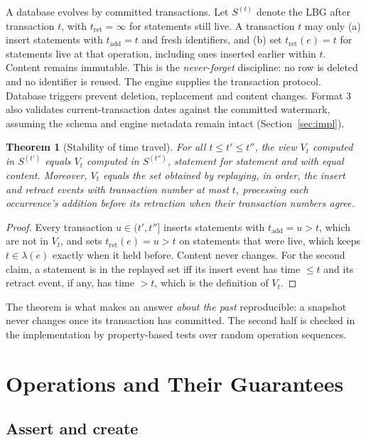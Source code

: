 \documentclass[11pt]{article}
\theoremstyle{plain}
\newtheorem{theorem}{Theorem}
\theoremstyle{definition}
\theoremstyle{remark}
\newcommand{\life}{\lambda}              %
\newcommand{\tadd}{t_{\mathrm{add}}}
\newcommand{\tret}{t_{\mathrm{ret}}}
\begin{document}
A database evolves by committed transactions. Let $S^{(t)}$ denote the LBG
after transaction $t$, with $\tret=\infty$ for statements still live. A
transaction $t$ may only (a) insert statements with $\tadd=t$ and fresh
identifiers, and (b) set $\tret(e)=t$ for statements live at that operation,
including ones inserted earlier within $t$. Content remains immutable.
This is the \emph{never-forget} discipline: no row is deleted and no identifier
is reused. The engine supplies the transaction protocol. Database triggers
prevent deletion, replacement and content changes. Format 3 also validates
current-transaction dates against the committed watermark, assuming the schema
and engine metadata remain intact (Section~\ref{sec:impl}).

\begin{theorem}[Stability of time travel]\label{thm:stability}
For all $t\le t'\le t''$, the view $V_t$ computed in $S^{(t')}$ equals $V_t$
computed in $S^{(t'')}$, statement for statement and with equal content.
Moreover, $V_t$ equals the set obtained by replaying, in order, the insert and
retract events with transaction number at most $t$, processing each occurrence's
addition before its retraction when their transaction numbers agree.
\end{theorem}

\begin{proof}
Every transaction $u\in(t',t'']$ inserts statements with $\tadd=u>t$, which
are not in $V_t$, and sets $\tret(e)=u>t$ on statements that were live, which
keeps $t\in\life(e)$ exactly when it held before. Content never changes. For
the second claim, a statement is in the replayed set iff its insert event has
time $\le t$ and its retract event, if any, has time $>t$, which is the
definition of $V_t$.
\end{proof}

The theorem is what makes an answer \emph{about the past} reproducible: a
snapshot never changes once its transaction has committed. The second half is
checked in the implementation by property-based tests over random operation
sequences.

\section{Operations and Their Guarantees}\label{sec:ops}

\subsection{Assert and create}
\end{document}
